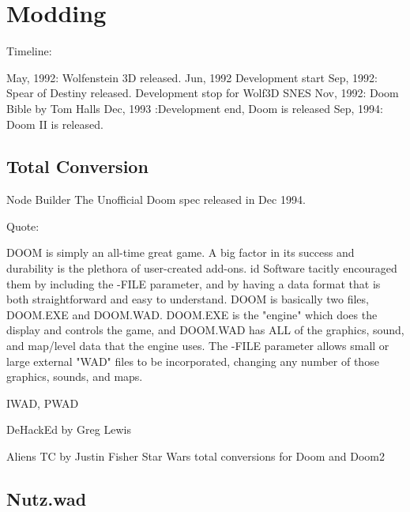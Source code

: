 \section{Modding}

\par
Timeline:

May, 1992: Wolfenstein 3D released.
Jun, 1992 Development start
Sep, 1992: Spear of Destiny released.
Development stop for Wolf3D SNES
Nov, 1992: Doom Bible by Tom Halls
Dec, 1993 :Development end, Doom is released
Sep, 1994: Doom II is released.


\subsection{Total Conversion}


Node Builder
The Unofficial Doom spec released in Dec 1994. 

Quote:

DOOM is simply an all-time great game. A big factor in its success
and durability is the plethora of user-created add-ons. id Software
tacitly encouraged them by including the -FILE parameter, and by having
a data format that is both straightforward and easy to understand.
DOOM is basically two files, DOOM.EXE and DOOM.WAD. DOOM.EXE is the
"engine" which does the display and controls the game, and DOOM.WAD has
ALL of the graphics, sound, and map/level data that the engine uses.
The -FILE parameter allows small or large external "WAD" files to be
incorporated, changing any number of those graphics, sounds, and maps.

IWAD, PWAD


DeHackEd by Greg Lewis


Aliens TC by Justin Fisher
Star Wars total conversions for Doom and Doom2

\subsection{Nutz.wad}

